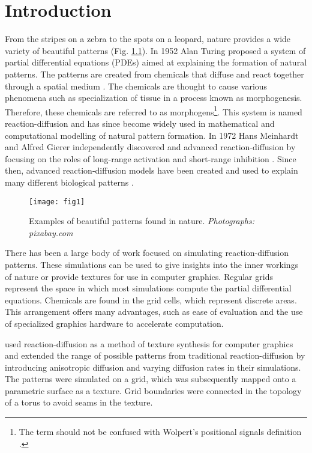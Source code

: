 \chapter{Introduction}
From the stripes on a zebra to the spots on a leopard, nature provides a wide variety of beautiful patterns (Fig. \ref{fig:naturalPatterns1}). In 1952 Alan Turing proposed a system of partial differential equations (PDEs) aimed at explaining the formation of natural patterns. The patterns are created from chemicals that diffuse and react together through a spatial medium \citep{turing1952}. The chemicals are thought to cause various phenomena such as specialization of tissue in a process known as morphogenesis. Therefore, these chemicals are referred to as morphogens\footnote{The term  should not be confused with Wolpert's positional signals definition \citep{wolpert1996}.}. This system is named reaction-diffusion and has since become widely used in mathematical and computational modelling of natural pattern formation. In 1972 Hans Meinhardt and Alfred Gierer independently discovered and advanced reaction-diffusion by focusing on the roles of long-range activation and short-range inhibition \citep{gierer1972}. Since then, advanced reaction-diffusion models have been created and used to explain many different biological patterns \citep{garzon2011, fowler1992, lefevre2010, meinhardt2009}.

\begin{figure}[H]
  \centering
  \texttt{[image: fig1]}
  \caption[Examples of beautiful patterns found in nature]{Examples of beautiful patterns found in nature. \textit{Photographs: pixabay.com}}
  \label{fig:naturalPatterns1}
\end{figure}

There has been a large body of work focused on simulating reaction-diffusion patterns. These simulations can be used to give insights into the inner workings of nature or provide textures for use in computer graphics. Regular grids represent the space in which most simulations compute the partial differential equations. Chemicals are found in the grid cells, which represent discrete areas. This arrangement offers many advantages, such as ease of evaluation and the use of specialized graphics hardware to accelerate computation.

\citet{witkin1991} used reaction-diffusion as a method of texture synthesis for computer graphics and extended the range of possible patterns from traditional reaction-diffusion by introducing anisotropic diffusion and varying diffusion rates in their simulations. The patterns were simulated on a grid, which was subsequently mapped onto a parametric surface as a texture. Grid boundaries were connected in the topology of a torus to avoid seams in the texture.

